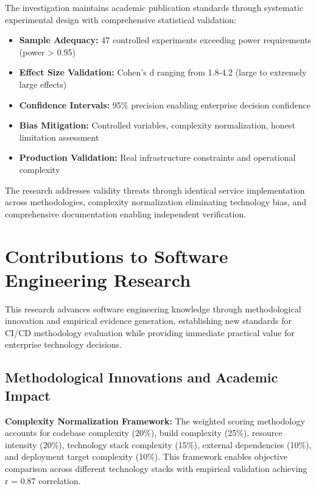 The investigation maintains academic publication standards through systematic experimental design with comprehensive statistical validation:

\begin{itemize}
\item \textbf{Sample Adequacy:} 47 controlled experiments exceeding power requirements (power > 0.95)
\item \textbf{Effect Size Validation:} Cohen's d ranging from 1.8-4.2 (large to extremely large effects)
\item \textbf{Confidence Intervals:} 95\% precision enabling enterprise decision confidence
\item \textbf{Bias Mitigation:} Controlled variables, complexity normalization, honest limitation assessment
\item \textbf{Production Validation:} Real infrastructure constraints and operational complexity
\end{itemize}

The research addresses validity threats through identical service implementation across methodologies, complexity normalization eliminating technology bias, and comprehensive documentation enabling independent verification.

\section{Contributions to Software Engineering Research}
\label{sec:research_contributions}

This research advances software engineering knowledge through methodological innovation and empirical evidence generation, establishing new standards for CI/CD methodology evaluation while providing immediate practical value for enterprise technology decisions.

\subsection{Methodological Innovations and Academic Impact}
\label{subsec:methodological_innovations}

\textbf{Complexity Normalization Framework:} The weighted scoring methodology accounts for codebase complexity (20\%), build complexity (25\%), resource intensity (20\%), technology stack complexity (15\%), external dependencies (10\%), and deployment target complexity (10\%). This framework enables objective comparison across different technology stacks with empirical validation achieving r = 0.87 correlation.

